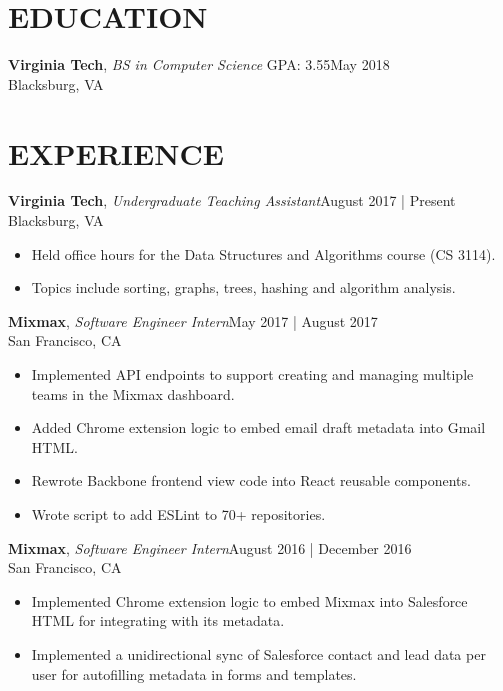 \documentclass[line,margin]{res}
\begin{document}
\address{vincentl@vt.edu | (703) 992-5598 | github.com/vinnyoodles}
\begin{resume}
	\vspace{-5mm}
	\section{EDUCATION}
	\textbf{Virginia Tech}, {\sl BS in Computer Science} GPA: 3.55\hfill May 2018\\Blacksburg, VA
	\section{EXPERIENCE}
	\textbf{Virginia Tech}, {\sl Undergraduate Teaching Assistant}\hfill August 2017 | Present\\Blacksburg, VA\\\begin{itemize} \itemsep 1pt
	\item Held office hours for the Data Structures and Algorithms course (CS 3114).
	\item Topics include sorting, graphs, trees, hashing and algorithm analysis.
	\end{itemize}
	\textbf{Mixmax}, {\sl Software Engineer Intern}\hfill May 2017 | August 2017\\San Francisco, CA\\\begin{itemize} \itemsep 1pt
	\item Implemented API endpoints to support creating and managing multiple teams in the Mixmax dashboard.
	\item Added Chrome extension logic to embed email draft metadata into Gmail HTML.
	\item Rewrote Backbone frontend view code into React reusable components.
	\item Wrote script to add ESLint to 70+ repositories.
	\end{itemize}
	\textbf{Mixmax}, {\sl Software Engineer Intern}\hfill August 2016 | December 2016\\San Francisco, CA\\\begin{itemize} \itemsep 1pt
	\item Implemented Chrome extension logic to embed Mixmax into Salesforce HTML for integrating with its metadata.
	\item Implemented a unidirectional sync of Salesforce contact and lead data per user for autofilling metadata in forms and templates.
	\end{itemize}

\end{resume}
\end{document}
